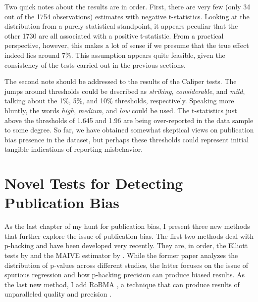 Two quick notes about the results are in order. First, there are very few (only 34 out of the 1754 observations) estimates with negative t-statistics. Looking at the distribution from a purely statistical standpoint, it appears peculiar that the other 1730 are all associated with a positive t-statistic. From a practical perspective, however, this makes a lot of sense if we presume that the true effect indeed lies around 7\%. This assumption appears quite feasible, given the consistency of the tests carried out in the previous sections.

The second note should be addressed to the results of the Caliper tests. The jumps around thresholds could be described as \textit{striking}, \textit{considerable}, and \textit{mild}, talking about the 1\%, 5\%, and 10\% thresholds, respectively. Speaking more bluntly, the words \textit{high}, \textit{medium}, and \textit{low} could be used. The t-statistics just above the thresholds of 1.645 and 1.96 are being over-reported in the data sample to some degree. So far, we have obtained somewhat skeptical views on publication bias presence in the dataset, but perhaps these thresholds could represent initial tangible indications of reporting misbehavior.

\section{Novel Tests for Detecting Publication Bias}
\label{sec:phacking}

As the last chapter of my hunt for publication bias, I present three new methods that further explore the issue of publication bias. The first two methods deal with p-hacking and have been developed very recently. They are, in order, the Elliott tests by \cite{elliott2022hacking} and the \ac{MAIVE} estimator by \cite{irsova2023maive}. While the former paper analyzes the distribution of p-values across different studies, the latter focuses on the issue of spurious regression and how p-hacking precision can produce biased results. As the last new method, I add \ac{RoBMA} \citep{maier2022robust}, a technique that can produce results of unparalleled quality and precision \citep{bartovs2023robust}.


